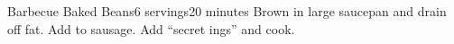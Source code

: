 \begin{recipe}{Barbecue Baked Beans}{6 servings}{20 minutes}
Brown in large saucepan and drain off fat.
Add to sausage.
Add ``secret ings'' and cook.
\end{recipe}
